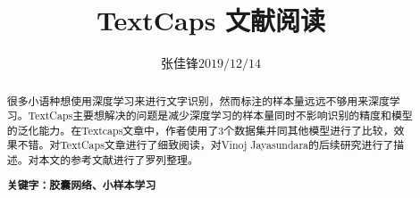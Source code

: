 \documentclass{ctexart}
\title{TextCaps 文献阅读}
\author{\begin{tabular}{ll}
	张佳锋 & $2019/12/14$
\end{tabular}}
\date{}
\begin{document}

\maketitle
{}
\begin{abstract}
很多小语种想使用深度学习来进行文字识别，然而标注的样本量远远不够用来深度学习。TextCaps主要想解决的问题是减少深度学习的样本量同时不影响识别的精度和模型的泛化能力。在Textcaps文章中，作者使用了3个数据集并同其他模型进行了比较，效果不错。对TextCaps文章进行了细致阅读，对Vinoj Jayasundara的后续研究进行了描述。对本文的参考文献进行了罗列整理。


\textbf{关键字：胶囊网络、小样本学习}
\end{abstract}









\newpage

\end{document}

